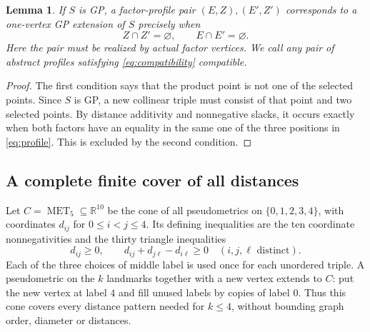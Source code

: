\documentclass[11pt]{article}
\newtheorem{lemma}[theorem]{Lemma}
\theoremstyle{definition}
\theoremstyle{remark}
\newcommand{\MET}{\operatorname{MET}}
\begin{document}
\begin{lemma}\label{lem:compatibility}
If $S$ is GP, a factor-profile pair $(E,Z),(E',Z')$ corresponds to a
one-vertex GP extension of $S$ precisely when
\begin{equation}\label{eq:compatibility}
 Z\cap Z'=\varnothing,\qquad E\cap E'=\varnothing.
\end{equation}
Here the pair must be realized by actual factor vertices. We call any pair
of abstract profiles satisfying \eqref{eq:compatibility} \emph{compatible}.
\end{lemma}
\begin{proof}
The first condition says that the product point is not one of the selected
points. Since $S$ is GP, a new collinear triple must consist of that point
and two selected points. By distance additivity and nonnegative slacks,
it occurs exactly when both factors have an equality in the same one of
the three positions in \eqref{eq:profile}. This is excluded by the second
condition.
\end{proof}

\subsection{A complete finite cover of all distances}

Let $C=\MET_5\subseteq\mathbb R^{10}$ be the cone of all pseudometrics on
$\{0,1,2,3,4\}$, with coordinates $d_{ij}$ for $0\leq i<j\leq4$.
Its defining inequalities are the ten coordinate nonnegativities and the
thirty triangle inequalities
\begin{equation}\label{eq:cone}
 d_{ij}\geq0,\qquad d_{ij}+d_{j\ell}-d_{i\ell}\geq0
 \quad (i,j,\ell\text{ distinct}).
\end{equation}
Each of the three choices of middle label is used once for each unordered
triple. A pseudometric on the $k$ landmarks together with a new vertex
extends to $C$: put the new vertex at label $4$ and fill unused labels by
copies of label $0$. Thus this cone covers every distance pattern needed
for $k\leq4$, without bounding graph order, diameter or distances.
\end{document}
